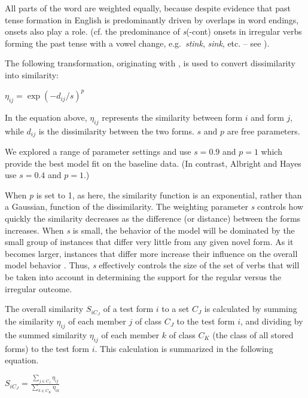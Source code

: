 \documentclass[12pt]{article}
\begin{document}
All parts of the word are weighted equally, because despite evidence that past tense formation in English is predominantly driven by overlaps in word endings, onsets also play a role. (cf. the predominance of \emph {s}(-cont) onsets in irregular verbs forming the past tense with a vowel change, e.g.\ {\em stink}, {\em sink}, etc. -- see \citealt{bybee1983morphological}). 

The following transformation, originating with \cite{nosofsky1990relations}, is used to convert dissimilarity into similarity:

\vspace{1cm}
$\eta_{ij} = \exp {(- d_{ij} /s)^p}$
\vspace{1cm}

In the equation above, $\eta_{ij}$ represents the similarity between form $i$ and form $j$, while  $d_{ij}$ is the dissimilarity between the two forms. $s$ and $p$ are free parameters.  

We explored a range of parameter settings and use $s = 0.9$ and $p = 1$ which provide the best model fit on the baseline data. (In contrast, Albright and Hayes use $s = 0.4$ and $p = 1$.)

When {\em p} is set to 1, as here, the similarity function is an exponential, rather than a Gaussian, function of the dissimilarity. The weighting parameter {\em s} controls how quickly the similarity decreases as the difference (or distance) between the forms increases. When {\em s} is small, the behavior of the model will be dominated by the small group of instances that differ very little from any given novel form. As it becomes larger, instances that differ more increase their influence on the overall model behavior
 \citep{nosofsky1990relations,nakisa2001dual,albright2003rules,dawdy2014learnability}. Thus, {\em s} effectively controls the size of the set of verbs that will be taken into account in determining the support for the regular versus the irregular outcome.

The overall similarity $S_{iC_J}$ of a test form $i$ to a set
$C_J$ is calculated by summing the similarity $\eta_{ij}$ of each member $j$ of class $C_J$ to the test form $i$, and dividing by the summed similarity $\eta_{ij}$ of each member $k$ of class $C_K$ (the class of all stored forms) to the test form $i$. 
This calculation is summarized in the following equation.

\vspace{1cm}
$S_{iC_J} = \frac{{\sum_{j \in C_J } \eta_{ij} } }{{\sum_{k\in C_K } \eta_{ik} }}$
\vspace{1cm}
\end{document}
